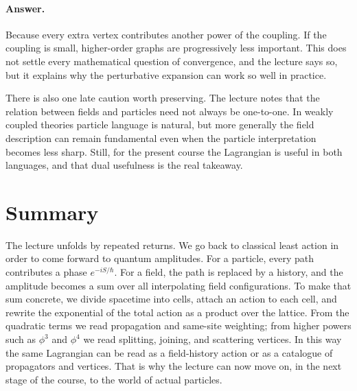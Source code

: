 \paragraph{Answer.} Because every extra vertex contributes another power of the coupling. If the coupling is small, higher-order graphs are progressively less important. This does not settle every mathematical question of convergence, and the lecture says so, but it explains why the perturbative expansion can work so well in practice.

There is also one late caution worth preserving. The lecture notes that the relation between fields and particles need not always be one-to-one. In weakly coupled theories particle language is natural, but more generally the field description can remain fundamental even when the particle interpretation becomes less sharp. Still, for the present course the Lagrangian is useful in both languages, and that dual usefulness is the real takeaway.

\section{Summary}

The lecture unfolds by repeated returns. We go back to classical least action in order to come forward to quantum amplitudes. For a particle, every path contributes a phase \(e^{-iS/\hbar}\). For a field, the path is replaced by a history, and the amplitude becomes a sum over all interpolating field configurations. To make that sum concrete, we divide spacetime into cells, attach an action to each cell, and rewrite the exponential of the total action as a product over the lattice. From the quadratic terms we read propagation and same-site weighting; from higher powers such as \(\phi^3\) and \(\phi^4\) we read splitting, joining, and scattering vertices. In this way the same Lagrangian can be read as a field-history action or as a catalogue of propagators and vertices. That is why the lecture can now move on, in the next stage of the course, to the world of actual particles.